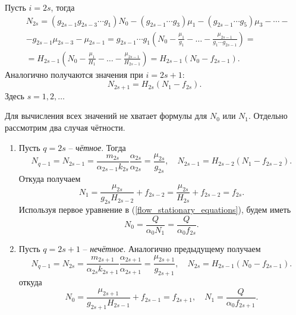     Пусть \(i = 2s\), тогда
    \begin{equation} \label{flow_2s}
        \begin{split}
        & N_{2s} = ( g_{2s-1} g_{2s-3} \cdots g_1 ) N_0 - ( g_{2s-1} \cdots g_3 ) \mu_1 - ( g_{2s-1} \cdots g_5 ) \mu_3 - \cdots - \\
        & - g_{2s-1} \mu_{2s-3} - \mu_{2s-1} = g_{2s-1} \cdots g_1 \left( N_0 - \frac{\mu_1}{g_1} - \dots - \frac{\mu_{2s-1}}{g_1 \cdots g_{2s-1}} \right) = \\
        & = H_{2s-1} \left( N_0 - \frac{\mu_1}{H_1} - \dots - \frac{\mu_{2s-1}}{H_{2s-1}} \right)
        = H_{2s-1} \left( N_0 - f_{2s-1} \right).
        \end{split}
    \end{equation}
    Аналогично получаются значения при \(i = 2s + 1\): 
    \begin{equation} \label{flow_2s1}
        N_{2s+1} = H_{2s} (N_1 - f_{2s}).
    \end{equation}
    Здесь \( s=1,2,\ldots \)

    Для вычисления всех значений не хватает формулы для \(N_0\) или \(N_1\). Отдельно рассмотрим два случая чётности.
    \begin{enumerate}
        \item Пусть \(q = 2s\) -- \textit{чётное}. Тогда
        \begin{equation*}
            N_{q-1} = N_{2s-1} = \frac{m_{2s}}{\alpha_{2s-1} k_{2s}} \frac{\alpha_{2s}}{\alpha_{2s}} = \frac{\mu_{2s}}{g_{2s}}, \quad N_{2s-1} = H_{2s-2} (N_1 - f_{2s-2}).
        \end{equation*}
        Откуда получаем
        \begin{equation*}
            N_1 = \frac{\mu_{2s}}{g_{2s} H_{2s-2}} + f_{2s-2} = \frac{\mu_{2s}}{H_{2s}} + f_{2s-2} = f_{2s}.
        \end{equation*}
        Используя первое уравнение в (\ref{flow_stationary_equations}), будем иметь
        \begin{equation*}
            N_0 = \frac{Q}{\alpha_0 N_1} = \frac{Q}{\alpha_0 f_{2s}}.
        \end{equation*}

        \item Пусть \(q = 2s+1\) -- \textit{нечётное}. Аналогично предыдущему получаем
        \begin{equation*}
            N_{q-1} = N_{2s} = \frac{m_{2s+1}}{\alpha_{2s} k_{2s+1}} \frac{\alpha_{2s+1}}{\alpha_{2s+1}} = \frac{\mu_{2s+1}}{g_{2s+1}}, \quad N_{2s} = H_{2s-1} (N_0 - f_{2s-1}).
        \end{equation*} 
        откуда
        \begin{equation*}
            N_0 = \frac{\mu_{2s+1}}{g_{2s+1} H_{2s-1}} + f_{2s-1} = f_{2s+1}, \quad N_1 = \frac{Q}{\alpha_0 f_{2s+1}}.
        \end{equation*}
    \end{enumerate}

